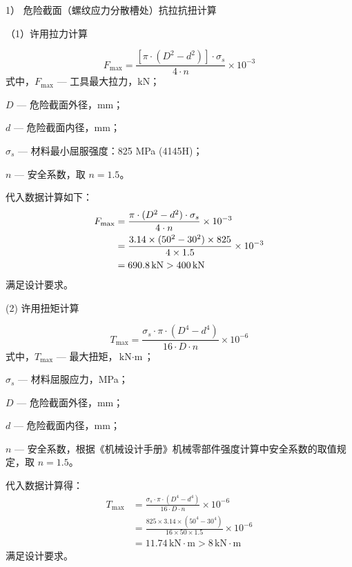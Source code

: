 1） 危险截面（螺纹应力分散槽处）抗拉抗扭计算

（1）许用拉力计算

\begin{equation}
    F_{\max} = \frac{[\pi \cdot (D^2 - d^2)] \cdot \sigma_s}{4 \cdot n} \times 10^{-3}
\end{equation}
式中，$F_{\max}$ — 工具最大拉力，kN；

$D$ — 危险截面外径，mm；

$d$ — 危险截面内径，mm；

$\sigma_s$ — 材料最小屈服强度：825 MPa (4145H)；

$n$ — 安全系数，取 $n = 1.5$。

代入数据计算如下：
\begin{equation}
\centering
\begin{aligned}
    F_{\max} &= \frac{\pi \cdot (D^2 - d^2) \cdot \sigma_s}{4 \cdot n} \times 10^{-3} \\
             &= \frac{3.14 \times (50^2 - 30^2) \times 825}{4 \times 1.5} \times 10^{-3} \\
             &= 690.8 \, \text{kN} > 400 \, \text{kN}
\end{aligned}
\end{equation}
满足设计要求。

(2) 许用扭矩计算

\begin{equation}
    T_{\max} = \frac{\sigma_s \cdot \pi \cdot (D^4 - d^4)}{16 \cdot D \cdot n} \times 10^{-6}
\end{equation}
式中，$T_{\max}$ — 最大扭矩，$\text{kN} \cdot \text{m}$；

$\sigma_s$ — 材料屈服应力，MPa；

$D$ — 危险截面外径，mm；

$d$ — 危险截面内径，mm；

$n$ — 安全系数，根据《机械设计手册》机械零部件强度计算中安全系数的取值规定\cite{ref26}，取 $n = 1.5$。

代入数据计算得：
\begin{equation}
\begin{aligned}
    T_{\max} &= \frac{\sigma_s \cdot \pi \cdot (D^4 - d^4)}{16 \cdot D \cdot n} \times 10^{-6} \\
             &= \frac{825 \times 3.14 \times (50^4 - 30^4)}{16 \times 50 \times 1.5} \times 10^{-6} \\
             &= 11.74 \, \text{kN} \cdot \text{m} > 8 \, \text{kN} \cdot \text{m} 
\end{aligned}
\end{equation}
满足设计要求。

